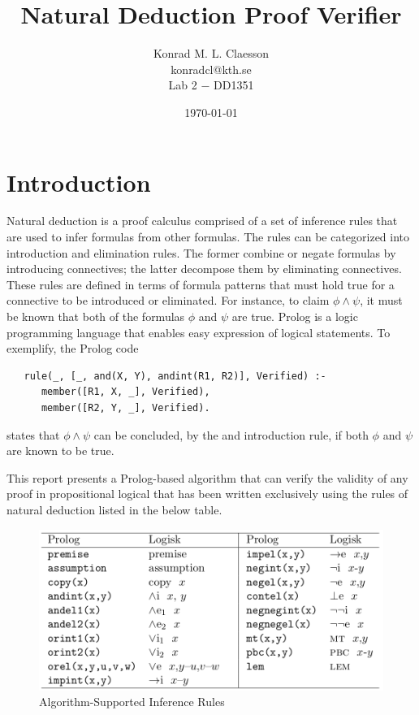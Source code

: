 \documentclass[a4paper, 11pt]{article}
\title{Natural Deduction Proof Verifier}
\author{Konrad M. L. Claesson\\ konradcl@kth.se\\ 
Lab 2 $-$ DD1351}
\date{\today}
\begin{document}
   \maketitle

   \section{Introduction}
   Natural deduction is a proof calculus comprised of a set of
   inference rules that are used to infer formulas from other
   formulas. The rules can be categorized into introduction
   and elimination rules. The former combine or negate
   formulas by introducing connectives; the latter decompose
   them by eliminating connectives. These rules are defined in
   terms of formula patterns that must hold true for a 
   connective to be introduced or eliminated. For instance, to
   claim $\phi \wedge \psi$, it must be known that
   both of the formulas $\phi$ and $\psi$ are true. Prolog is
   a logic programming language that enables easy expression 
   of logical statements. To exemplify, the Prolog code
   
   \begin{verbatim}
   rule(_, [_, and(X, Y), andint(R1, R2)], Verified) :-
      member([R1, X, _], Verified),
      member([R2, Y, _], Verified).
   \end{verbatim}
   
   states that $\phi \wedge \psi$ can be concluded, by the and
   introduction rule, if both $\phi$ and $\psi$ are known to
   be true. 
   \bigbreak

   This report presents a Prolog-based algorithm that can
   verify the validity of any proof in propositional logical 
   that has been written exclusively using the rules of
   natural deduction listed in the below table.

   \begin{figure}
      \centering
      \includegraphics[scale=0.325]{inference-rules}
      \caption{Algorithm-Supported Inference Rules}
   \end{figure}
\end{document}
